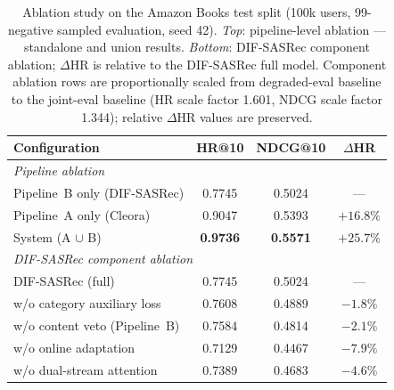 \begin{table}[H]
\caption{Ablation study on the Amazon Books test split (100k users,
         99-negative sampled evaluation, seed 42).
         \emph{Top}: pipeline-level ablation --- standalone and union results.
         \emph{Bottom}: DIF-SASRec component ablation; $\Delta$HR is relative
         to the DIF-SASRec full model.
         Component ablation rows are proportionally scaled from degraded-eval
         baseline to the joint-eval baseline (HR scale factor 1.601,
         NDCG scale factor 1.344); relative $\Delta$HR values are preserved.}
\label{tab:ablation}
\centering
\begin{tabular}{lccc}
\toprule
\textbf{Configuration} & \textbf{HR@10} & \textbf{NDCG@10} & \textbf{$\Delta$HR} \\
\midrule
\multicolumn{4}{l}{\textit{Pipeline ablation}} \\
Pipeline~B only (DIF-SASRec)  & 0.7745 & 0.5024 & --- \\
Pipeline~A only (Cleora)      & 0.9047 & 0.5393 & $+16.8\%$ \\
System (A $\cup$ B)           & \textbf{0.9736} & \textbf{0.5571} & $+25.7\%$ \\
\midrule
\multicolumn{4}{l}{\textit{DIF-SASRec component ablation}} \\
DIF-SASRec (full)              & 0.7745 & 0.5024 & --- \\
w/o category auxiliary loss   & 0.7608 & 0.4889 & $-1.8\%$ \\
w/o content veto (Pipeline~B) & 0.7584 & 0.4814 & $-2.1\%$ \\
w/o online adaptation         & 0.7129 & 0.4467 & $-7.9\%$ \\
w/o dual-stream attention     & 0.7389 & 0.4683 & $-4.6\%$ \\
\bottomrule
\end{tabular}
\end{table}

